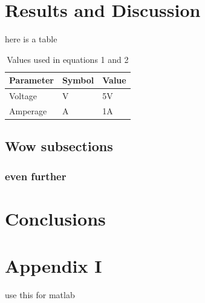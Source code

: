 \documentclass[a4paper,11pt]{YuGroup}
\begin{document}
\section{Results and Discussion}

here is a table 
\begin{longtable}{lll}
\caption{Values used in equations 1 and 2}
\label{tab:my-table}\\
Parameter & Symbol & Value \\
\endhead
%
Voltage & V & 5V \\
Amperage & A & 1A
\end{longtable}

\subsection{Wow subsections}
\subsubsection{even further}


\section{Conclusions}
\appendix
\section{Appendix I}
use this for matlab


 
\printbibliography %
\end{document}
